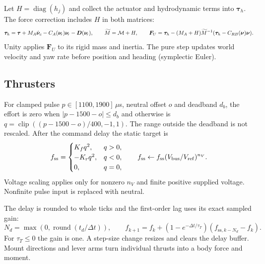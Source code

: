 Let $H=\operatorname{diag}(h_j)$ and collect the actuator and hydrodynamic terms
into $\bm\tau_h$. The force correction includes $H$ in both matrices:
\[
 \bm\tau_h=\bm\tau+M_A\dot{\bm{\nu}}_c-C_A(\bm{\nu}_{\!r})\bm{\nu}_{\!r}-\bm D(\bm{\nu}_{\!r}),\qquad
 \widetilde M=\mathcal{M}+H,\qquad
 \bm F_U=\bm\tau_h-(M_A+H)\widetilde M^{-1}
          (\bm\tau_h-C_{RB}(\bm{\nu})\bm{\nu}).
\]
Unity applies $\bm F_U$ to its rigid mass and inertia. The pure step updates
world velocity and yaw rate before position and heading (symplectic Euler).

\subsection{Thrusters}

For clamped pulse $p\in[1100,1900]$\,$\mu$s, neutral offset $o$ and deadband
$d_b$, the effort is zero when $|p-1500-o|\le d_b$ and otherwise is
$q=\operatorname{clip}((p-1500-o)/400,-1,1)$. The range outside the deadband
is not rescaled. After the command delay the static target is
\[
 f_{\mathrm{ss}}=\begin{cases}K_fq^2,&q>0,\\-K_rq^2,&q<0,\\0,&q=0,\end{cases}
 \qquad f_{\mathrm{ss}}\leftarrow f_{\mathrm{ss}}(\Vbus/V_{\mathrm{ref}})^{n_V}.
\]
Voltage scaling applies only for nonzero $n_V$ and finite positive supplied
voltage. Nonfinite pulse input is replaced with neutral.

The delay is rounded to whole ticks and the first-order lag uses its exact
sampled gain:
\[
 N_d=\max(0,\operatorname{round}(t_d/\Delta t)),\qquad
 f_{k+1}=f_k+(1-e^{-\Delta t/\tau_T})(f_{\mathrm{ss},k-N_d}-f_k).
\]
For $\tau_T\le0$ the gain is one. A step-size change resizes and clears the
delay buffer. Mount directions and lever arms turn individual thrusts into a
body force and moment.

